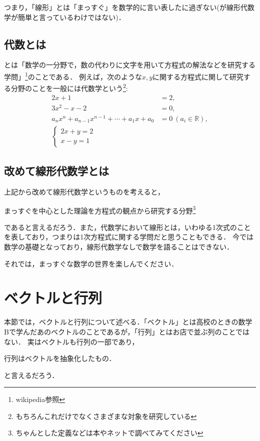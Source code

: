 \documentclass[a4paper,12pt,autodetect-engine,dvipdfmx]{jsarticle}
\theoremstyle{definition}
\begin{document}
つまり，「線形」とは「まっすぐ」を数学的に言い表したに過ぎない(が線形代数学が簡単と言っているわけではない)．
\subsection{代数とは}
とは「数学の一分野で，数の代わりに文字を用いて方程式の解法などを研究する学問」\footnote{wikipedia参照}のことである．
例えば，次のような$x,y$に関する方程式に関して研究する分野のことを一般には代数学という\footnote{もちろんこれだけでなくさまざまな対象を研究している}:
\begin{align*}
2x + 1 &= 2,\\
3x^2 - x - 2 &= 0,\\
a_{n}x^n + a_{n-1}x^{n-1} + \cdots + a_{1}x + a_{0} &= 0\ (a_{i} \in \mathbb{R}),\\
\begin{cases}
    2x + y = 2 \\
    x - y = 1
\end{cases}
\end{align*}

\subsection{改めて線形代数学とは}
上記から改めて線形代数学というものを考えると，
\begin{center}
まっすぐを中心とした理論を方程式の観点から研究する分野\footnote{ちゃんとした定義などは本やネットで調べてみてください}
\end{center}
であると言えるだろう．また，代数学において線形とは，いわゆる1次式のことを表しており，つまりは1次方程式に関する学問だと思うこともできる．
今では数学の基礎となっており，線形代数学なしで数学を語ることはできない．

それでは，まっすぐな数学の世界を楽しんでください．
\section{ベクトルと行列}
本節では，ベクトルと行列について述べる．「ベクトル」とは高校のときの数学Bで学んだあのベクトルのことであるが，「行列」とはお店で並ぶ列のことではない． 
実はベクトルも行列の一部であり，
\begin{center}
    行列はベクトルを抽象化したもの．
\end{center}
と言えるだろう．
\end{document}
